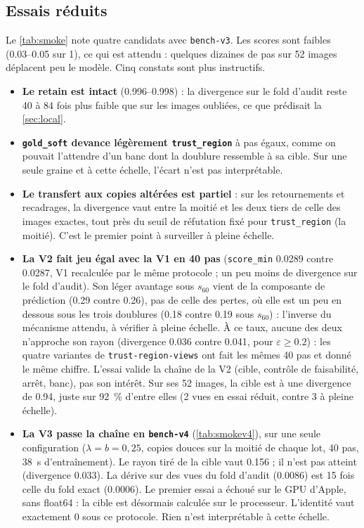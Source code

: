 \documentclass[11pt,a4paper]{article}
\newcommand{\code}[1]{\texttt{#1}}
\begin{document}
\subsection{Essais réduits}
Le \cref{tab:smoke} note quatre candidats avec \code{bench-v3}. Les scores sont faibles (\numrange{0.03}{0.05}
sur 1), ce qui est attendu : quelques dizaines de pas sur 52 images déplacent peu le modèle. Cinq
constats sont plus instructifs.
\begin{itemize}[leftmargin=1.2em]
  \item \textbf{Le retain est intact} (\numrange{0.996}{0.998}) : la divergence sur le fold d'audit
    reste 40 à 84 fois plus faible que sur les images oubliées, ce que prédisait la
    \cref{sec:local}.
  \item \textbf{\code{gold\_soft} devance légèrement \code{trust\_region}} à pas égaux, comme on
    pouvait l'attendre d'un banc dont la doublure ressemble à sa cible. Sur une seule graine et à
    cette échelle, l'écart n'est pas interprétable.
  \item \textbf{Le transfert aux copies altérées est partiel} : sur les retournements et
    recadrages, la divergence vaut entre la moitié et les deux tiers de celle des images exactes,
    tout près du seuil de réfutation fixé pour \code{trust\_region} (la moitié). C'est le premier
    point à surveiller à pleine échelle.
  \item \textbf{La V2 fait jeu égal avec la V1 en 40 pas} (\code{score\_min} \num{0.0289}
    contre \num{0.0287}, V1 recalculée par le même protocole ; un peu moins de divergence sur le
    fold d'audit). Son léger avantage sous $s_{60}$ vient de la composante de prédiction (\num{0.29}
    contre \num{0.26}), pas de celle des pertes, où elle est un peu en dessous sous les trois
    doublures (\num{0.18} contre \num{0.19} sous $s_{60}$) : l'inverse du mécanisme attendu, à
    vérifier à pleine échelle. À ce taux, aucune des deux n'approche son rayon (divergence
    \num{0.036} contre \num{0.041}, pour $\varepsilon\ge\num{0.2}$) : les quatre variantes de
    \code{trust-region-views} ont fait les mêmes 40 pas et donné le même chiffre. L'essai valide la
    chaîne de la V2 (cible, contrôle de faisabilité, arrêt, banc), pas son intérêt. Sur ses 52
    images, la cible est à une divergence de \num{0.94}, juste sur \SI{92}{\percent} d'entre elles
    (2 vues en essai réduit, contre 3 à pleine échelle).
  \item \textbf{La V3 passe la chaîne en \code{bench-v4}} (\cref{tab:smokev4}), sur une seule
    configuration ($\lambda=b=0{,}25$, copies douces sur la moitié de chaque lot, 40 pas,
    \SI{38}{\second} d'entraînement). Le rayon tiré de la cible vaut \num{0.156} ; il n'est pas
    atteint (divergence \num{0.033}). La dérive sur des vues du fold d'audit (\num{0.0086}) est
    15 fois celle du fold exact (\num{0.0006}). Le premier essai a
    échoué sur le GPU d'Apple, sans float64 : la cible est désormais calculée sur le processeur.
    L'identité vaut exactement 0 sous ce protocole. Rien n'est interprétable à cette échelle.
\end{itemize}
\end{document}

